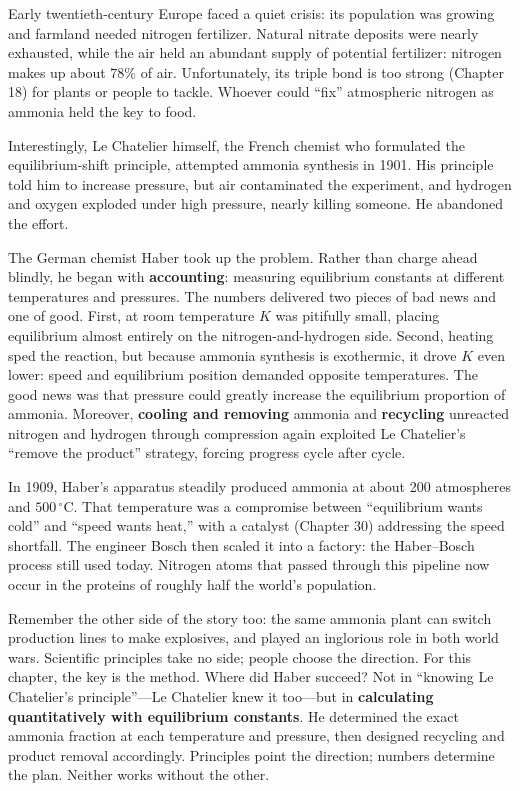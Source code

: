 \begin{zhengju}
Early twentieth-century Europe faced a quiet crisis: its population was growing and farmland needed nitrogen fertilizer. Natural nitrate deposits were nearly exhausted, while the air held an abundant supply of potential fertilizer: nitrogen makes up about $78\%$ of air. Unfortunately, its triple bond is too strong (Chapter 18) for plants or people to tackle. Whoever could ``fix'' atmospheric nitrogen as ammonia held the key to food.

Interestingly, Le Chatelier himself, the French chemist who formulated the equilibrium-shift principle, attempted ammonia synthesis in 1901. His principle told him to increase pressure, but air contaminated the experiment, and hydrogen and oxygen exploded under high pressure, nearly killing someone. He abandoned the effort.

The German chemist Haber took up the problem. Rather than charge ahead blindly, he began with \textbf{accounting}: measuring equilibrium constants at different temperatures and pressures. The numbers delivered two pieces of bad news and one of good. First, at room temperature $K$ was pitifully small, placing equilibrium almost entirely on the nitrogen-and-hydrogen side. Second, heating sped the reaction, but because ammonia synthesis is exothermic, it drove $K$ even lower: speed and equilibrium position demanded opposite temperatures. The good news was that pressure could greatly increase the equilibrium proportion of ammonia. Moreover, \textbf{cooling and removing} ammonia and \textbf{recycling} unreacted nitrogen and hydrogen through compression again exploited Le Chatelier's ``remove the product'' strategy, forcing progress cycle after cycle.

In 1909, Haber's apparatus steadily produced ammonia at about 200 atmospheres and $500\,^{\circ}\mathrm{C}$. That temperature was a compromise between ``equilibrium wants cold'' and ``speed wants heat,'' with a catalyst (Chapter 30) addressing the speed shortfall. The engineer Bosch then scaled it into a factory: the Haber--Bosch process still used today. Nitrogen atoms that passed through this pipeline now occur in the proteins of roughly half the world's population.

Remember the other side of the story too: the same ammonia plant can switch production lines to make explosives, and played an inglorious role in both world wars. Scientific principles take no side; people choose the direction. For this chapter, the key is the method. Where did Haber succeed? Not in ``knowing Le Chatelier's principle''---Le Chatelier knew it too---but in \textbf{calculating quantitatively with equilibrium constants}. He determined the exact ammonia fraction at each temperature and pressure, then designed recycling and product removal accordingly. Principles point the direction; numbers determine the plan. Neither works without the other.
\end{zhengju}

